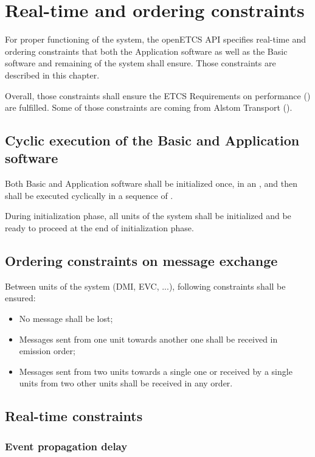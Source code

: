\chapter{Real-time and ordering constraints}

For proper functioning of the system, the openETCS API specifies
real-time and ordering constraints that both the Application software
as well as the Basic software and remaining of the system shall
ensure. Those constraints are described in this chapter.

Overall, those constraints shall ensure the ETCS Requirements on
performance (\cite{subset-041}) are fulfilled. Some of those
constraints are coming from Alstom Transport (\cite{alstom-api}).

\section{Cyclic execution of the Basic and Application software}

Both Basic and Application software shall be initialized once, in an
, and then shall be executed cyclically
in a sequence of .

During initialization phase, all units of the system shall be
initialized and be ready to proceed at the end of initialization
phase.

\section{Ordering constraints on message exchange}
\label{sec:ordering-constraints}

Between units of the system (DMI, EVC, ...), following constraints
shall be ensured:
\begin{itemize}
\item No message shall be lost;
\item Messages sent from one unit towards another one shall be
  received in emission order;
\item Messages sent from two units towards a
single one or received by a single units from two other units shall be
received in any order.
\end{itemize}

\section{Real-time constraints}

\subsection{Event propagation delay}
\label{sec:event-propagation-delay}

